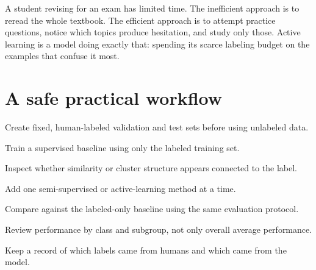 \begin{mlfigure}
\end{mlfigure}

\begin{analogy}
A student revising for an exam has limited time. The inefficient approach is to reread the whole textbook. The efficient approach is to attempt practice questions, notice which topics produce hesitation, and study only those. Active learning is a model doing exactly that: spending its scarce labeling budget on the examples that confuse it most.
\end{analogy}

\section{A safe practical workflow}

\begin{mlsteps}
  \item Create fixed, human-labeled validation and test sets before using unlabeled data.
  \item Train a supervised baseline using only the labeled training set.
  \item Inspect whether similarity or cluster structure appears connected to the label.
  \item Add one semi-supervised or active-learning method at a time.
  \item Compare against the labeled-only baseline using the same evaluation protocol.
  \item Review performance by class and subgroup, not only overall average performance.
  \item Keep a record of which labels came from humans and which came from the model.
\end{mlsteps}

